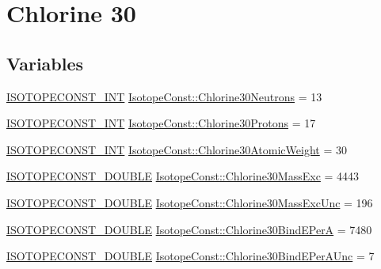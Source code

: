 \hypertarget{group___isotope_const-_chlorine-_cl30}{}\section{Chlorine 30}
\label{group___isotope_const-_chlorine-_cl30}
\subsection*{Variables}
\begin{DoxyCompactItemize}
\item 
\mbox{\hyperlink{group___isotope_const-_macros_ga5f18360b3e99483a35c32d789e62621c}{I\+S\+O\+T\+O\+P\+E\+C\+O\+N\+S\+T\+\_\+\+I\+NT}} \mbox{\hyperlink{group___isotope_const-_chlorine-_cl30_ga7f176edb30d08eea4adda6ae000db454}{Isotope\+Const\+::\+Chlorine30\+Neutrons}} = 13
\item 
\mbox{\hyperlink{group___isotope_const-_macros_ga5f18360b3e99483a35c32d789e62621c}{I\+S\+O\+T\+O\+P\+E\+C\+O\+N\+S\+T\+\_\+\+I\+NT}} \mbox{\hyperlink{group___isotope_const-_chlorine-_cl30_ga132d31c342f780b36d6b81198cb1f95d}{Isotope\+Const\+::\+Chlorine30\+Protons}} = 17
\item 
\mbox{\hyperlink{group___isotope_const-_macros_ga5f18360b3e99483a35c32d789e62621c}{I\+S\+O\+T\+O\+P\+E\+C\+O\+N\+S\+T\+\_\+\+I\+NT}} \mbox{\hyperlink{group___isotope_const-_chlorine-_cl30_gab33a9568a734b9dbb2913042b36d6ab6}{Isotope\+Const\+::\+Chlorine30\+Atomic\+Weight}} = 30
\item 
\mbox{\hyperlink{group___isotope_const-_macros_ga8f45a7272ce02c0b4c65c44636ed719a}{I\+S\+O\+T\+O\+P\+E\+C\+O\+N\+S\+T\+\_\+\+D\+O\+U\+B\+LE}} \mbox{\hyperlink{group___isotope_const-_chlorine-_cl30_gaae42d1a6367601cd4f52793c1c4e9770}{Isotope\+Const\+::\+Chlorine30\+Mass\+Exc}} = 4443
\item 
\mbox{\hyperlink{group___isotope_const-_macros_ga8f45a7272ce02c0b4c65c44636ed719a}{I\+S\+O\+T\+O\+P\+E\+C\+O\+N\+S\+T\+\_\+\+D\+O\+U\+B\+LE}} \mbox{\hyperlink{group___isotope_const-_chlorine-_cl30_ga536deaa1a04317df3edc76b3e33ac351}{Isotope\+Const\+::\+Chlorine30\+Mass\+Exc\+Unc}} = 196
\item 
\mbox{\hyperlink{group___isotope_const-_macros_ga8f45a7272ce02c0b4c65c44636ed719a}{I\+S\+O\+T\+O\+P\+E\+C\+O\+N\+S\+T\+\_\+\+D\+O\+U\+B\+LE}} \mbox{\hyperlink{group___isotope_const-_chlorine-_cl30_gacd2b579b785c6ad201a7f705498f28f0}{Isotope\+Const\+::\+Chlorine30\+Bind\+E\+PerA}} = 7480
\item 
\mbox{\hyperlink{group___isotope_const-_macros_ga8f45a7272ce02c0b4c65c44636ed719a}{I\+S\+O\+T\+O\+P\+E\+C\+O\+N\+S\+T\+\_\+\+D\+O\+U\+B\+LE}} \mbox{\hyperlink{group___isotope_const-_chlorine-_cl30_ga692eccd52acbb9c40dcad19ce18f2648}{Isotope\+Const\+::\+Chlorine30\+Bind\+E\+Per\+A\+Unc}} = 7

\end{DoxyCompactItemize}
